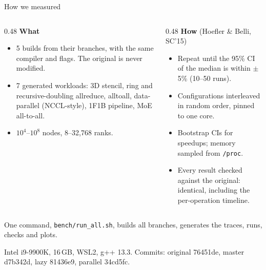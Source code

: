 \documentclass[aspectratio=169,11pt]{beamer}
\newcommand{\highlight}[1]{\colorbox{cream}{\parbox{\dimexpr\linewidth-2\fboxsep}{\small #1}}}
\newcommand{\source}[1]{{\scriptsize\color{black!55}\par\vspace{2mm}#1\par}}
\begin{document}
\begin{frame}{How we measured}
\begin{columns}[T]
\begin{column}{0.48\textwidth}
\textbf{What}
\small
\begin{itemize}
\item 5 builds from their branches, with the same compiler and flags. The original is never modified.
\item 7 generated workloads: 3D stencil, ring and recursive-doubling allreduce, alltoall, data-parallel (NCCL-style), 1F1B pipeline, MoE all-to-all.
\item $10^4$--$10^8$ nodes, 8--32,768 ranks.
\end{itemize}
\end{column}
\begin{column}{0.48\textwidth}
\textbf{How} {\small (Hoefler \& Belli, SC'15)}
\small
\begin{itemize}
\item Repeat until the 95\% CI of the median is within $\pm$5\% (10--50 runs).
\item Configurations interleaved in random order, pinned to one core.
\item Bootstrap CIs for speedups; memory sampled from \texttt{/proc}.
\item Every result checked against the original: identical, including the per-operation timeline.
\end{itemize}
\end{column}
\end{columns}
\vspace{4mm}
\highlight{\raggedright One command, \texttt{bench/run\_all.sh}, builds all branches, generates the traces, runs, checks and plots.}
\source{Intel i9-9900K, 16\,GB, WSL2, g++ 13.3. Commits: original 76451de, master d7b342d, lazy 81436e9, parallel 34cd5fc.}
\end{frame}
\end{document}
